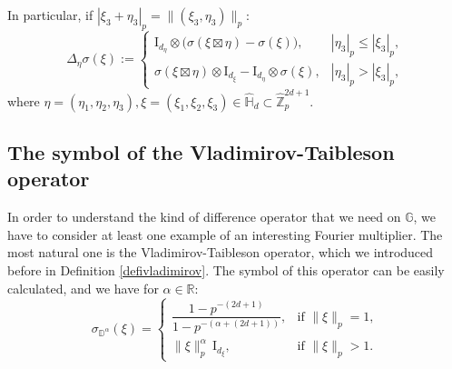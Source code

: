 \documentclass[12pt, reqno]{amsart}
\newcommand{\1}{\mathds{1}}
\begin{document}
In particular, if $|\xi_3 + \eta_3|_p = \|(\xi_3, \eta_3)\|_p$:
\[
\Delta_\eta \sigma(\xi) :=
\begin{cases}
\mathrm{I}_{d_\eta} \otimes \big(\sigma(\xi \boxtimes \eta) - \sigma(\xi)\big), & |\eta_3|_p \le |\xi_3|_p, \\
\sigma(\xi \boxtimes \eta) \otimes \mathrm{I}_{d_\xi} - \mathrm{I}_{d_\eta} \otimes \sigma(\xi), & |\eta_3|_p > |\xi_3|_p,
\end{cases}
\]
where $\eta = (\eta_1, \eta_2, \eta_3), \xi = (\xi_1, \xi_2, \xi_3) \in \widehat{\mathbb{H}}_d \subset \widehat{\mathbb{Z}}_p^{2d+1}$.

\subsection{The symbol of the Vladimirov-Taibleson operator}

In order to understand the kind of difference operator that we need on $\mathbb{G}$, we have to consider at least one example of an interesting Fourier multiplier. The most natural one is the Vladimirov-Taibleson operator, which we introduced before in Definition \ref{defivladimirov}. The symbol of this operator can be easily calculated, and we have for $\alpha \in \mathbb{R}$:
\[
\sigma_{\mathbb{D}^\alpha}(\xi) =
\begin{cases}
\dfrac{1-p^{-(2d+1)}}{1-p^{-(\alpha+(2d+1))}}, & \text{if } \|\xi\|_p = 1, \\[1.2em]
\|\xi\|_p^\alpha \, \mathrm{I}_{d_\xi}, & \text{if } \|\xi\|_p > 1.
\end{cases}
\]
\end{document}
